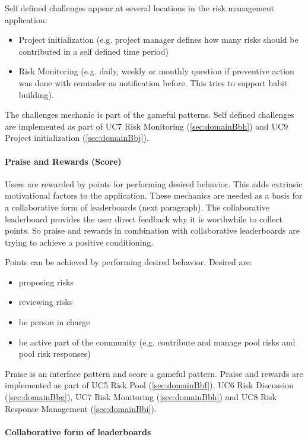 \noindent
Self defined challenges appear at several locations in the risk management application:
\begin{itemize}
	\item Project initialization (e.g. project manager defines how many risks should be contributed in a self defined time period)
	\item Risk Monitoring (e.g. daily, weekly or monthly question if preventive action was done with reminder as notification before. This tries to support habit building).
\end{itemize}

The challenges mechanic is part of the gameful patterns. 
Self defined challenges are implemented as part of \ac{UC}7 Risk Monitoring (\ref{sec:domainBbh}) and \ac{UC}9 Project initialization (\ref{sec:domainBbj}).

\paragraph*{Praise and Rewards (Score)}

Users are rewarded by points for performing desired behavior. This adds extrinsic motivational factors to the application. These mechanics are needed as a basis for a collaborative form of leaderboards (next paragraph). The collaborative leaderboard provides the user direct feedback why it is worthwhile to collect points. So praise and rewards in combination with collaborative leaderboards are trying to achieve a positive conditioning.

Points can be achieved by performing desired behavior. Desired are:
\begin{itemize}
	\item proposing risks
	\item reviewing risks
	\item be person in charge
	\item be active part of the community (e.g. contribute and manage pool risks and pool risk responses)
\end{itemize}

Praise is an interface pattern and score a gameful pattern.
Praise and rewards are implemented as part of \ac{UC}5 Risk Pool (\ref{sec:domainBbf}), \ac{UC}6 Risk Discussion (\ref{sec:domainBbg}), \ac{UC}7 Risk Monitoring (\ref{sec:domainBbh}) and \ac{UC}8 Risk Response Management (\ref{sec:domainBbi}).

\paragraph*{Collaborative form of leaderboards}


